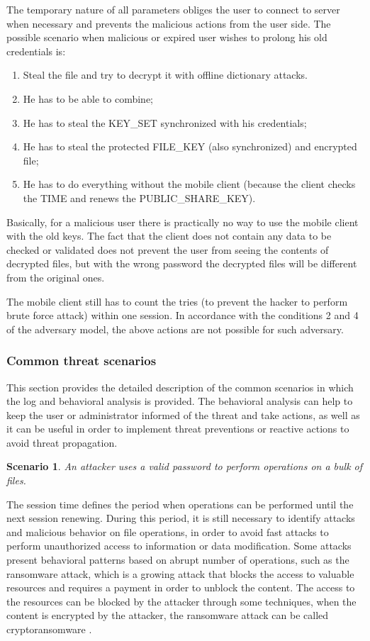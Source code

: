 \documentclass[twocolumn]{svjour3}          	%
\newtheorem{thm}{Scenario}
\begin{document}
The temporary nature of all parameters obliges the user to connect to server when necessary and prevents the malicious actions from the user side. The possible scenario when malicious or expired user wishes to prolong his old credentials is:

\begin{enumerate}[label=(\alph*)]
	\item Steal the file and try to decrypt it with offline dictionary attacks.
	\item He has to be able to combine;
	\item He has to steal the KEY\_SET synchronized with his credentials;
	\item He has to steal the protected FILE\_KEY (also synchronized) and encrypted file;
	\item He has to do everything without the mobile client (because the client checks the TIME and renews the PUBLIC\_SHARE\_KEY).
\end{enumerate}

Basically, for a malicious user there is practically no way to use the mobile client with the old keys. The fact that the client does not contain any data to be checked or validated does not prevent the user from seeing the contents of decrypted files, but with the wrong password the decrypted files will be different from the original ones.

The mobile client still has to count the tries (to prevent the hacker to perform brute force attack) within one session. In accordance with the conditions 2 and 4 of the adversary model, the above actions are not possible for such adversary.

\subsubsection{Common threat scenarios}
\label{sec_common}
This section provides the detailed description of the common scenarios in which the log and behavioral analysis is provided. The behavioral analysis can help to keep the user or administrator informed of the threat and take actions, as well as it can be useful in order to implement threat preventions or reactive actions to avoid threat propagation.

\begin{thm}
An attacker uses a valid password to perform operations on a bulk of files.
\end{thm}

The session time defines the period when operations can be performed until the next session renewing. During this period, it is still necessary to identify attacks and malicious behavior on file operations, in order to avoid fast attacks to perform unauthorized access to information or data modification. Some attacks present behavioral patterns based on abrupt number of operations, such as the ransomware attack, which is a growing attack \cite{McAfee2015} that blocks the access to valuable resources and requires a payment in order to unblock the content. The access to the resources can be blocked by the attacker through some techniques, when the content is encrypted by the attacker, the ransomware attack can be called cryptoransomware \cite{kaspersky2014}.
\end{document}
